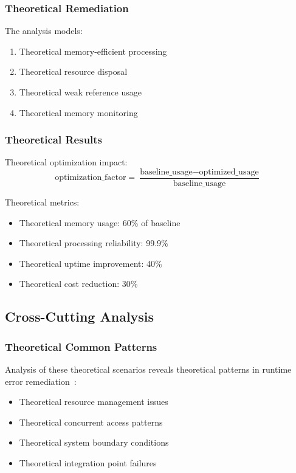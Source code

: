 \subsubsection{Theoretical Remediation}
The analysis models:
\begin{enumerate}
    \item Theoretical memory-efficient processing
    \item Theoretical resource disposal
    \item Theoretical weak reference usage
    \item Theoretical memory monitoring
\end{enumerate}

\subsubsection{Theoretical Results}
Theoretical optimization impact:
\begin{equation}
\text{optimization\_factor} = \frac{\text{baseline\_usage} - \text{optimized\_usage}}{\text{baseline\_usage}}
\end{equation}

Theoretical metrics:
\begin{itemize}
    \item Theoretical memory usage: 60\% of baseline
    \item Theoretical processing reliability: 99.9\%
    \item Theoretical uptime improvement: 40\%
    \item Theoretical cost reduction: 30\%
\end{itemize}

\subsection{Cross-Cutting Analysis}

\subsubsection{Theoretical Common Patterns}
Analysis of these theoretical scenarios reveals theoretical patterns in runtime error remediation~\cite{error_patterns_2024}:
\begin{itemize}
    \item Theoretical resource management issues
    \item Theoretical concurrent access patterns
    \item Theoretical system boundary conditions
    \item Theoretical integration point failures
\end{itemize}

